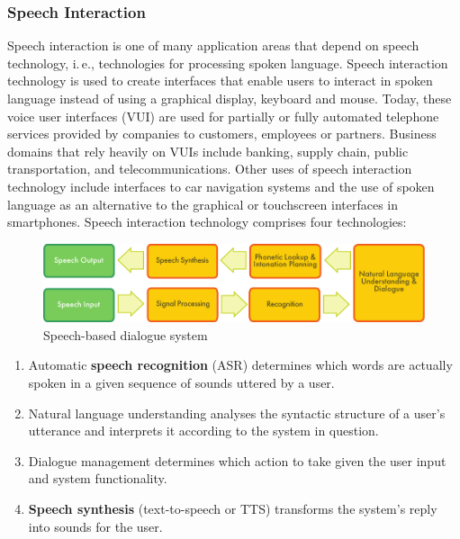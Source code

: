 \begin{multicols}{2}
\subsubsection{Speech Interaction}

Speech interaction is one of many application areas that depend on speech technology, i.\,e., technologies for processing spoken language. Speech interaction technology is used to create interfaces that enable users to interact in spoken language instead of using a graphical display, keyboard and mouse.  Today, these voice user interfaces (VUI) are used for partially or fully automated telephone services provided by companies to customers, employees or partners. Business domains that rely heavily on VUIs include banking, supply chain, public transportation, and telecommunications. Other uses of speech interaction technology include interfaces to car navigation systems and the use of spoken language as an alternative to the graphical or touchscreen interfaces in smartphones. Speech interaction technology comprises four technologies: 

\begin{figure}[htb]
  \center
  \includegraphics[width=\textwidth]{../_media/english/simple_speech-based_dialogue_architecture}
  \caption{Speech-based dialogue system}
  \label{fig:dialoguearch_en}
\end{figure}

\begin{enumerate}
\item Automatic \textbf{speech recognition} (ASR) determines which words are actually spoken in a given sequence of sounds uttered by a user.  
\item Natural language understanding analyses the syntactic structure of a user’s utterance and interprets it according to the system in question.
\item Dialogue management determines which action to take given the user input and system functionality.   
\item \textbf{Speech synthesis} (text-to-speech or TTS) transforms the system’s reply into sounds for the user.
\end{enumerate}


\end{multicols}
